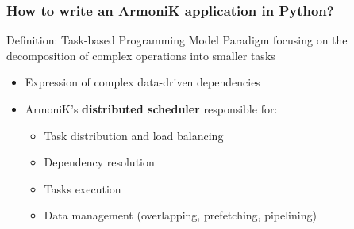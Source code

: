 \begin{frame}
	\frametitle{How to write an ArmoniK application in Python?}
	\begin{block}{Definition: Task-based Programming Model}
		Paradigm focusing on the decomposition of complex operations into smaller tasks
	\end{block}
	\begin{itemize}
		\item Expression of complex data-driven dependencies
		\item ArmoniK's \textbf{distributed scheduler} responsible for:
		      \begin{itemize}
			      \item Task distribution and load balancing
			      \item Dependency resolution
			      \item Tasks execution
			      \item Data management (overlapping, prefetching, pipelining)
		      \end{itemize}
	\end{itemize}
	\footnotesize
	\inputminted{python}{task-based-programming.py}
\end{frame}


